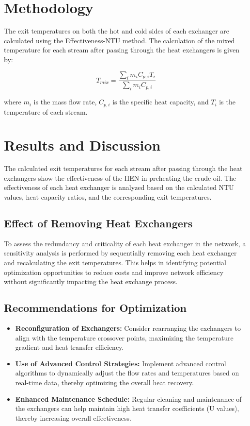 \documentclass[12pt]{article}
\begin{document}
\section{Methodology}
The exit temperatures on both the hot and cold sides of each exchanger are calculated using the Effectiveness-NTU method. The calculation of the mixed temperature for each stream after passing through the heat exchangers is given by:

\begin{equation}
T_{mix} = \frac{\sum_i m_i C_{p,i} T_i}{\sum_i m_i C_{p,i}}
\end{equation}

where \( m_i \) is the mass flow rate, \( C_{p,i} \) is the specific heat capacity, and \( T_i \) is the temperature of each stream.

\section{Results and Discussion}
The calculated exit temperatures for each stream after passing through the heat exchangers show the effectiveness of the HEN in preheating the crude oil. The effectiveness of each heat exchanger is analyzed based on the calculated NTU values, heat capacity ratios, and the corresponding exit temperatures. 

\subsection{Effect of Removing Heat Exchangers}
To assess the redundancy and criticality of each heat exchanger in the network, a sensitivity analysis is performed by sequentially removing each heat exchanger and recalculating the exit temperatures. This helps in identifying potential optimization opportunities to reduce costs and improve network efficiency without significantly impacting the heat exchange process.

\subsection{Recommendations for Optimization}
\begin{itemize}
    \item \textbf{Reconfiguration of Exchangers:} Consider rearranging the exchangers to align with the temperature crossover points, maximizing the temperature gradient and heat transfer efficiency.
    \item \textbf{Use of Advanced Control Strategies:} Implement advanced control algorithms to dynamically adjust the flow rates and temperatures based on real-time data, thereby optimizing the overall heat recovery.
    \item \textbf{Enhanced Maintenance Schedule:} Regular cleaning and maintenance of the exchangers can help maintain high heat transfer coefficients (U values), thereby increasing overall effectiveness.
\end{itemize}
\end{document}
